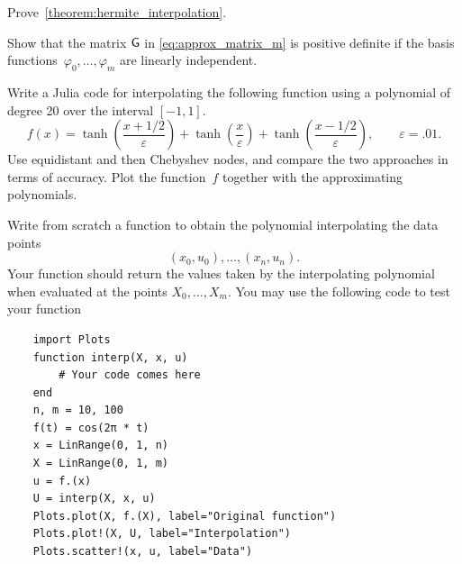 \begin{exercise}
    \label{exercise:proof_hermite}
    Prove~\cref{theorem:hermite_interpolation}.
\end{exercise}

\begin{exercise}
    \label{exercise:matrix_approx}
    Show that the matrix $\mathsf G$ in \eqref{eq:approx_matrix_m} is positive definite
    if the basis functions~$\varphi_0, \dotsc, \varphi_m$ are linearly independent.
\end{exercise}

\begin{compexercise}
    Write a Julia code for interpolating the following function using a polynomial of degree 20 over the interval $[-1, 1]$.
    \[
        f(x) = \tanh\left(\frac{x+1/2}{\varepsilon}\right) + \tanh\left(\frac{x}{\varepsilon}\right) + \tanh\left(\frac{x-1/2}{\varepsilon}\right),
        \qquad \varepsilon = .01.
    \]
    Use equidistant and then Chebyshev nodes,
    and compare the two approaches in terms of accuracy.
    Plot the function~$f$ together with the approximating polynomials.
\end{compexercise}

\begin{compexercise}
    Write from scratch a function to obtain the polynomial interpolating the data points
    \[
        (x_0, u_0), \dotsc, (x_n, u_n).
    \]
    Your function should return the values taken by the interpolating polynomial
    when evaluated at the points $X_0, \dotsc, X_m$.
    You may use the following code to test your function
    \begin{verbatim}
    import Plots
    function interp(X, x, u)
        # Your code comes here
    end
    n, m = 10, 100
    f(t) = cos(2π * t)
    x = LinRange(0, 1, n)
    X = LinRange(0, 1, m)
    u = f.(x)
    U = interp(X, x, u)
    Plots.plot(X, f.(X), label="Original function")
    Plots.plot!(X, U, label="Interpolation")
    Plots.scatter!(x, u, label="Data")
    \end{verbatim}
\end{compexercise}

